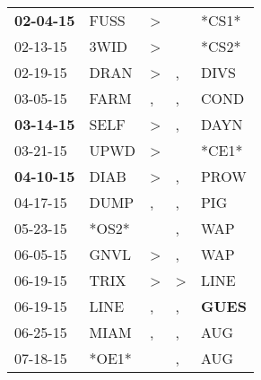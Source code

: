 \begin{supertabular}{p{0.07\textwidth}p{0.06\textwidth}p{0.02\textwidth}p{0.02\textwidth}p{0.06\textwidth}}
 \textbf{02-04-15\textsuperscript{}} &           FUSS\textsuperscript{} &     \textgreater &                  &                            *CS1* \\
          02-13-15\textsuperscript{} &           3WID\textsuperscript{} &     \textgreater &                  &                            *CS2* \\
          02-19-15\textsuperscript{} &           DRAN\textsuperscript{} &     \textgreater &                , &           DIVS\textsuperscript{} \\
          03-05-15\textsuperscript{} &           FARM\textsuperscript{} &                , &                , &           COND\textsuperscript{} \\
 \textbf{03-14-15\textsuperscript{}} &           SELF\textsuperscript{} &     \textgreater &                , &           DAYN\textsuperscript{} \\
          03-21-15\textsuperscript{} &           UPWD\textsuperscript{} &     \textgreater &                  &                            *CE1* \\
 \textbf{04-10-15\textsuperscript{}} &           DIAB\textsuperscript{} &     \textgreater &                , &           PROW\textsuperscript{} \\
          04-17-15\textsuperscript{} &           DUMP\textsuperscript{} &                , &                , &            PIG\textsuperscript{} \\
          05-23-15\textsuperscript{} &                            *OS2* &                  &                , &            WAP\textsuperscript{} \\
          06-05-15\textsuperscript{} &           GNVL\textsuperscript{} &     \textgreater &                , &            WAP\textsuperscript{} \\
          06-19-15\textsuperscript{} &           TRIX\textsuperscript{} &     \textgreater &     \textgreater &           LINE\textsuperscript{} \\
          06-19-15\textsuperscript{} &           LINE\textsuperscript{} &                , &                , &  \textbf{GUES\textsuperscript{}} \\
          06-25-15\textsuperscript{} &           MIAM\textsuperscript{} &                , &                , &            AUG\textsuperscript{} \\
          07-18-15\textsuperscript{} &                            *OE1* &                  &                , &            AUG\textsuperscript{} \\

\end{supertabular}
